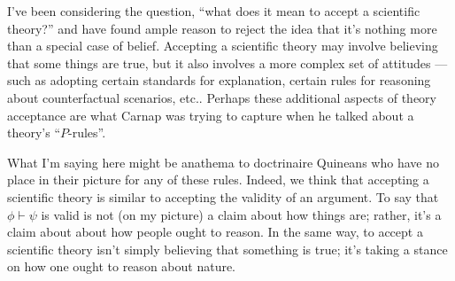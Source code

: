I've been considering the question, ``what does it mean to accept a
scientific theory?'' and have found ample reason to reject the idea
that it's nothing more than a special case of belief.  Accepting a
scientific theory may involve believing that some things are true, but
it also involves a more complex set of attitudes --- such as adopting
certain standards for explanation, certain rules for reasoning about
counterfactual scenarios, etc..  Perhaps these additional aspects of
theory acceptance are what Carnap was trying to capture when he talked
about a theory's ``$P$-rules''.

What I'm saying here might be anathema to doctrinaire Quineans who
have no place in their picture for any of these rules.  Indeed, we
think that accepting a scientific theory is similar to accepting the
validity of an argument.  To say that $\phi\vdash\psi$ is valid is not
(on my picture) a claim about how things are; rather, it's a claim
about about how people ought to reason.  In the same way, to accept a
scientific theory isn't simply believing that something is true; it's
taking a stance on how one ought to reason about nature.




